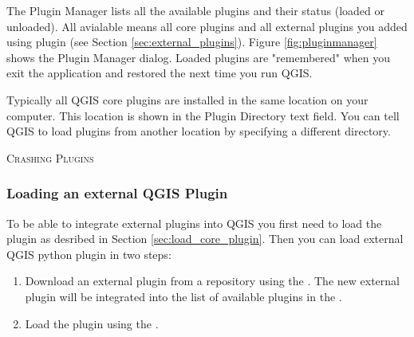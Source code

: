 The Plugin Manager lists all the available plugins and their status (loaded or 
unloaded). All avialable means all core plugins and all external plugins you 
added using  plugin (see Section 
\ref{sec:external_plugins}). Figure \ref{fig:pluginmanager} shows the Plugin 
Manager dialog. Loaded plugins are "remembered" when you exit the application 
and restored the next time you run QGIS.

Typically all QGIS core plugins are installed in the same location on your 
computer. This location is shown in the Plugin Directory text field.
You can tell QGIS to load plugins from another location by specifying a
different directory.

\begin{Tip}\caption{\textsc{Crashing Plugins}}
\end{Tip} 

\subsubsection{Loading an external QGIS Plugin}\label{sec:load_external_plugin} 

To be able to integrate external plugins into QGIS you first need to load the 
 plugin as desribed in Section 
\ref{sec:load_core_plugin}. Then you can load external QGIS python plugin 
in two steps: 

\begin{enumerate}
\item Download an external plugin from a repository using the 
. The new external plugin will be integrated into 
the list of available plugins in the .
\item Load the plugin using the .
\end{enumerate}

